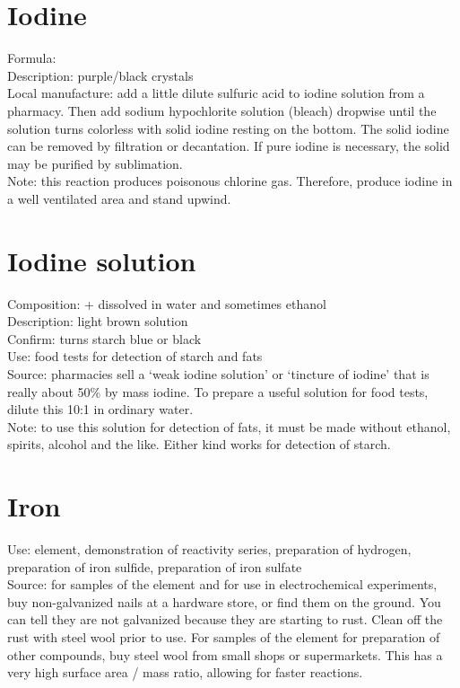 \section{Iodine}
Formula: \\
Description: purple/black crystals\\
Local manufacture: add a little dilute sulfuric acid 
to iodine solution from a pharmacy. 
Then add sodium hypochlorite solution (bleach) dropwise 
until the solution turns colorless with solid iodine resting on the bottom. 
The solid iodine can be removed by filtration or decantation. 
If pure iodine is necessary, 
the solid may be purified by sublimation.\\
Note: this reaction produces poisonous chlorine gas. 
Therefore, 
produce iodine in a well ventilated area and stand upwind.

\section{Iodine solution}
\label{sec:iodinesol}
Composition:  +  dissolved in water and sometimes ethanol\\
Description: light brown solution\\
Confirm: turns starch blue or black\\
Use: food tests for detection of starch and fats\\
Source: pharmacies sell a ‘weak iodine solution’ 
or ‘tincture of iodine’ that is really about 50\% by mass iodine. 
To prepare a useful solution for food tests, 
dilute this 10:1 in ordinary water.\\
Note: to use this solution for detection of fats, 
it must be made without ethanol, 
spirits, 
alcohol and the like. 
Either kind works for detection of starch.

\section{Iron}
\label{sec:iron}
Use: element, 
demonstration of reactivity series, 
preparation of hydrogen, 
preparation of iron sulfide, 
preparation of iron sulfate\\
Source: for samples of the element 
and for use in electrochemical experiments, 
buy non-galvanized nails at a hardware store, 
or find them on the ground. 
You can tell they are not galvanized because they are starting to rust. 
Clean off the rust with steel wool prior to use. 
For samples of the element for preparation of other compounds, 
buy steel wool from small shops or supermarkets. 
This has a very high surface area / mass ratio, 
allowing for faster reactions.

